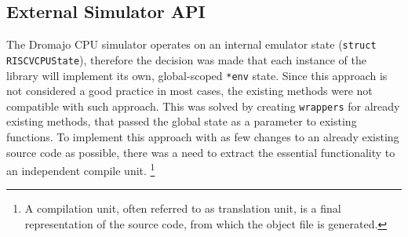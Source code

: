 \pagebreak

\subsection{External Simulator API}

The Dromajo CPU simulator operates on an internal emulator state (\texttt{struct RISCVCPUState}), therefore the decision was made that each
instance of the library will implement its own, global-scoped \texttt{*env} state. Since this approach is not considered
a good practice in most cases, the existing methods were not compatible with such approach. This was solved by
creating \texttt{wrappers} for already existing methods, that passed the global state as a parameter to existing
functions. To implement this approach with as few changes to an already existing source code as possible, there was a need to
extract the essential functionality to an independent compile unit.%
\footnote{A compilation unit, often referred to as translation unit, is a final representation of the source code,
from which the object file is generated.}

